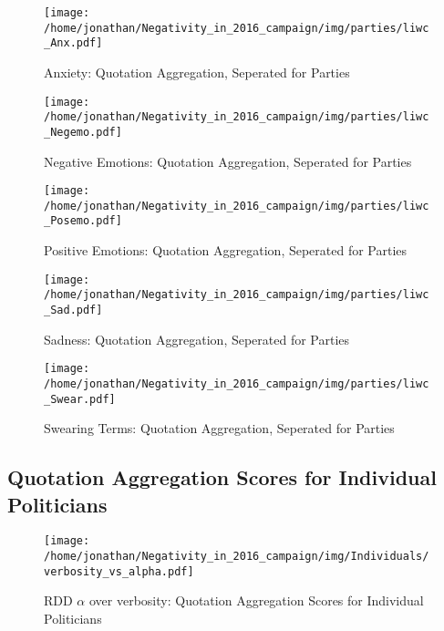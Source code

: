 \begin{figure}[h]\centering
	\texttt{[image: /home/jonathan/Negativity\_in\_2016\_campaign/img/parties/liwc\_Anx.pdf]}
	\caption{Anxiety: Quotation Aggregation, Seperated for Parties}
	\label{fig: parties_Anxiety}
\end{figure}

\begin{figure}[h]\centering
	\texttt{[image: /home/jonathan/Negativity\_in\_2016\_campaign/img/parties/liwc\_Negemo.pdf]}
	\caption{Negative Emotions: Quotation Aggregation, Seperated for Parties}
	\label{fig: parties_Negative Emotions}
\end{figure}

\begin{figure}[h]\centering
	\texttt{[image: /home/jonathan/Negativity\_in\_2016\_campaign/img/parties/liwc\_Posemo.pdf]}
	\caption{Positive Emotions: Quotation Aggregation, Seperated for Parties}
	\label{fig: parties_Positive Emotions}
\end{figure}

\begin{figure}[h]\centering
	\texttt{[image: /home/jonathan/Negativity\_in\_2016\_campaign/img/parties/liwc\_Sad.pdf]}
	\caption{Sadness: Quotation Aggregation, Seperated for Parties}
	\label{fig: parties_Sadness}
\end{figure}

\begin{figure}[h]\centering
	\texttt{[image: /home/jonathan/Negativity\_in\_2016\_campaign/img/parties/liwc\_Swear.pdf]}
	\caption{Swearing Terms: Quotation Aggregation, Seperated for Parties}
	\label{fig: parties_Swearing Terms}
\end{figure}

\clearpage
\pagebreak

\subsection{Quotation Aggregation Scores for Individual Politicians}

\begin{figure}[h]\centering
	\texttt{[image: /home/jonathan/Negativity\_in\_2016\_campaign/img/Individuals/verbosity\_vs\_alpha.pdf]}
	\caption{RDD $\alpha$ over verbosity: Quotation Aggregation Scores for Individual Politicians}
	\label{fig: individuals_RDD alpha over verbosity}
\end{figure}


